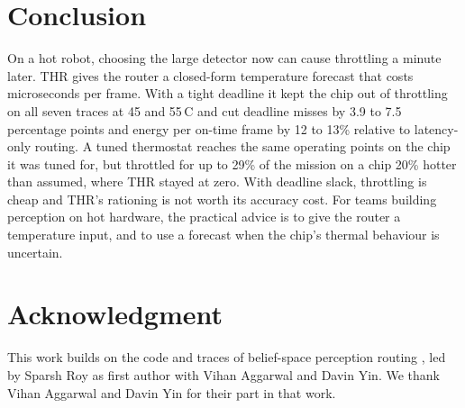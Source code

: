 \documentclass[conference,compsoc]{IEEEtran}
\newcommand{\degc}{\,\textdegree C}
\begin{document}
\section{Conclusion}

On a hot robot, choosing the large detector now can cause throttling a
minute later. THR gives the router a closed-form temperature forecast
that costs microseconds per frame. With a tight deadline it kept the
chip out of throttling on all seven traces at 45 and 55\degc{} and cut
deadline misses by 3.9 to 7.5 percentage points and energy per on-time
frame by 12 to 13\% relative to latency-only routing. A tuned thermostat
reaches the same operating points on the chip it was tuned for, but
throttled for up to 29\% of the mission on a chip 20\% hotter than
assumed, where THR stayed at zero. With deadline slack, throttling is
cheap and THR's rationing is not worth its accuracy cost. For teams
building perception on hot hardware, the practical advice is to give
the router a temperature input, and to use a forecast when the chip's
thermal behaviour is uncertain.

\section*{Acknowledgment}
This work builds on the code and traces of belief-space perception
routing \cite{roy2026beliefspace}, led by Sparsh Roy as first author
with Vihan Aggarwal and Davin Yin. We thank Vihan Aggarwal and Davin
Yin for their part in that work.



\end{document}
